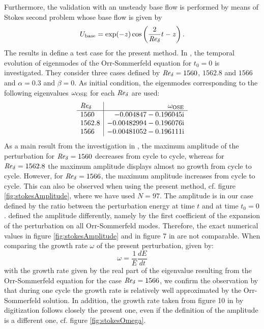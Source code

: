 \documentclass{jfm}
\newcommand\be{\begin{equation}}
\newcommand\ee{\end{equation}}
\newcommand\base{{\rm base}}
\newcommand\Rey{\mbox{\textit{Re}}}  %
\begin{document}
\begin{appendix}
Furthermore, the validation with an unsteady base
flow is performed by means of Stokes second problem whose base flow is given by
\be
U_\base = \exp(-z) \cos \left( \frac{2}{\Rey_\delta} t - z \right).
\ee
The results in \citet{LuoWu2010} define a test case for the present method. In
\citet{LuoWu2010}, the temporal evolution of eigenmodes of the Orr-Sommerfeld
equation for $ t_0 = 0 $ is investigated. They consider three
cases defined by $ \Rey_\delta = 1560 $, $ 1562.8 $ and $ 1566 $
and $ \alpha = 0.3 $ and $ \beta = 0 $. As initial condition, the
eigenmodes corresponding to the following eigenvalues $ \omega_{\rm OSE} $ for
each $ \Rey_\delta $ are used:
\[
\begin{array}{l|r}
  \Rey_\delta & \omega_{\rm OSE} \\
  \hline
  1560 & -0.004847-0.196045 {\rm i} \\
  1562.8 & -0.00482994-0.196076{\rm i} \\
  1566 & -0.00481052-0.196111{\rm i} 
  \end{array}
\]
As a main result from the investigation in \cite{LuoWu2010}, the maximum amplitude
of the perturbation for $ \Rey_\delta = 1560 $ decreases from cycle to cycle,
whereas for $ \Rey_\delta = 1562.8 $ the maximum amplitude displays almost no growth from cycle to cycle. However,
for $ \Rey_\delta = 1566 $, the maximum amplitude increases from cycle to
cycle. This can also be observed when using the present method, cf. figure \ref{fig:stokesAmplitude},
where we have used $ N = 97 $.
The amplitude is in our case defined by the ratio between the perturbation
energy at time $ t $ and at time $ t_0 = 0 $. \cite{LuoWu2010} defined the amplitude
differently, namely
by the first coefficient of the expansion of the perturbation on all Orr-Sommerfeld modes.
Therefore, the exact numerical values in figure \ref{fig:stokesAmplitude} and in figure 7 in
\cite{LuoWu2010} are not comparable. When comparing the growth rate $ \omega $ of
the present perturbation, given by:
\be
\omega = \frac{1}{E} \frac{ dE}{dt} 
\ee
with the growth rate given by the real part of the eigenvalue resulting from the Orr-Sommerfeld
equation for the case $ \Rey_\delta = 1566 $, we confirm the observation by \cite[figure 10]{LuoWu2010} that during one cycle the growth rate is relatively well approximated by the Orr-Sommerfeld
solution. In addition, the growth rate taken from figure 10 in \cite{LuoWu2010} by
digitization follows closely the present one, even if the definition of the
amplitude is a different one, cf. figure \ref{fig:stokesOmega}. \\


\end{appendix}
\end{document}
